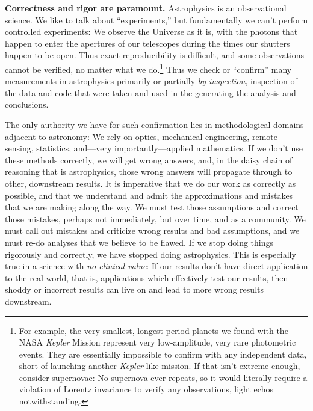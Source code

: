 \documentclass{article}
\newcommand{\paragraphskip}{\medskip}
\renewcommand{\paragraph}[1]{\par\paragraphskip\noindent\textbf{#1}}
\begin{document}
\paragraph{Correctness and rigor are paramount.}
Astrophysics is an observational science.
We like to talk about ``experiments,'' but fundamentally we can't perform controlled experiments:
We observe the Universe as it is, with the photons that happen to enter the apertures of our telescopes during the times our shutters happen to be open.
Thus exact reproducibility is difficult, and some observations cannot be verified, no matter what we do.\footnote{%
For example, the very smallest, longest-period planets we found with the NASA \textsl{Kepler} Mission \cite{keplerresults} represent very low-amplitude, very rare photometric events.
They are essentially impossible to confirm with any independent data, short of launching another \textsl{Kepler}-like mission.
If that isn't extreme enough, consider supernovae:
No supernova ever repeats, so it would literally require a violation of Lorentz invariance to verify any observations, light echos \cite{lightecho} notwithstanding.}
Thus we check or ``confirm'' many measurements in astrophysics primarily or partially \emph{by inspection}, inspection of the data and code that were taken and used in the generating the analysis and conclusions.

The only authority we have for such confirmation lies in methodological domains adjacent to astronomy:
We rely on optics, mechanical engineering, remote sensing, statistics, and---very importantly---applied mathematics.
If we don't use these methods correctly, we will get wrong answers, and, in the daisy chain of reasoning that is astrophysics, those wrong answers will propagate through to other, downstream results.
It is imperative that we do our work as correctly as possible, and that we understand and admit the approximations and mistakes that we are making along the way.
We must test those assumptions and correct those mistakes, perhaps not immediately, but over time, and as a community.
We must call out mistakes and criticize wrong results and bad assumptions, and we must re-do analyses that we believe to be flawed.
If we stop doing things rigorously and correctly, we have stopped doing astrophysics.
This is especially true in a science with \emph{no clinical value}:
If our results don't have direct application to the real world, that is, applications which effectively test our results, then shoddy or incorrect results can live on and lead to more wrong results downstream.
\end{document}
